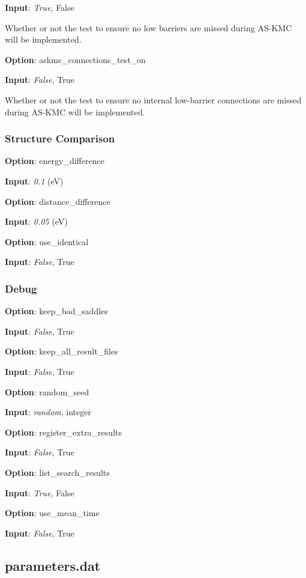 \documentclass{article}
\begin{document}
\noindent\textbf{Input}:  \emph{True}, False

Whether or not the test to ensure no low barriers are missed during AS-KMC will be implemented.

\noindent\textbf{Option}:  askmc\_connections\_test\_on

\noindent\textbf{Input}:  \emph{False}, True

Whether or not the test to ensure no internal low-barrier connections are missed during AS-KMC will be implemented.

\subsubsection{Structure Comparison}

\noindent\textbf{Option}:  energy\_difference

\noindent\textbf{Input}:  \emph{0.1} (eV)

\noindent\textbf{Option}:  distance\_difference

\noindent\textbf{Input}:  \emph{0.05} (eV)

\noindent\textbf{Option}:  use\_identical

\noindent\textbf{Input}:  \emph{False}, True

\subsubsection{Debug}

\noindent\textbf{Option}:  keep\_bad\_saddles

\noindent\textbf{Input}:  \emph{False}, True

\noindent\textbf{Option}:  keep\_all\_result\_files

\noindent\textbf{Input}:  \emph{False}, True

\noindent\textbf{Option}:  random\_seed

\noindent\textbf{Input}:  \emph{random}, integer

\noindent\textbf{Option}:  register\_extra\_results

\noindent\textbf{Input}:  \emph{False}, True

\noindent\textbf{Option}:  list\_search\_results

\noindent\textbf{Input}:  \emph{True}, False

\noindent\textbf{Option}:  use\_mean\_time

\noindent\textbf{Input}:  \emph{False}, True

\subsection{parameters.dat}
\end{document}
